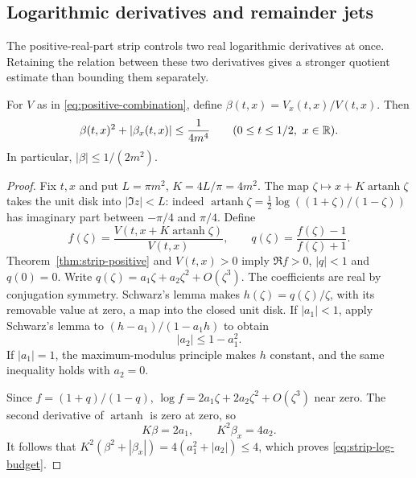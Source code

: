 \subsection{Logarithmic derivatives and remainder jets}

The positive-real-part strip controls two real logarithmic derivatives
at once. Retaining the relation between these two derivatives gives a
stronger quotient estimate than bounding them separately.

\begin{lemma}\label{lem:strip-Schwarz}
For $V$ as in \eqref{eq:positive-combination}, define
$\beta(t,x)=V_x(t,x)/V(t,x)$. Then
\begin{equation}\label{eq:strip-log-budget}
 \beta(t,x)^2+|\beta_x(t,x)|\le\frac1{4m^4}
 \qquad(0\le t\le1/2,\ x\in\mathbb R).
\end{equation}
In particular, $|\beta|\le1/(2m^2)$.
\end{lemma}
\begin{proof}
Fix $t,x$ and put $L=\pi m^2$, $K=4L/\pi=4m^2$. The map
$\zeta\mapsto x+K\operatorname{artanh}\zeta$ takes the unit disk
into $|\Im z|<L$: indeed
$\operatorname{artanh}\zeta=\frac12\log((1+\zeta)/(1-\zeta))$
has imaginary part between $-\pi/4$ and $\pi/4$. Define
\[
 f(\zeta)=\frac{V(t,x+K\operatorname{artanh}\zeta)}{V(t,x)},\qquad
 q(\zeta)=\frac{f(\zeta)-1}{f(\zeta)+1}.
\]
Theorem~\ref{thm:strip-positive} and $V(t,x)>0$ imply
$\Re f>0$, $|q|<1$ and $q(0)=0$. Write
$q(\zeta)=a_1\zeta+a_2\zeta^2+O(\zeta^3)$. The coefficients are
real by conjugation symmetry. Schwarz's lemma makes
$h(\zeta)=q(\zeta)/\zeta$, with its removable value at zero, a map
into the closed unit disk. If $|a_1|<1$, apply Schwarz's lemma to
$(h-a_1)/(1-a_1h)$ to obtain
\[
 |a_2|\le1-a_1^2.
\]
If $|a_1|=1$, the maximum-modulus principle makes $h$ constant, and
the same inequality holds with $a_2=0$.

Since $f=(1+q)/(1-q)$,
$\log f=2a_1\zeta+2a_2\zeta^2+O(\zeta^3)$ near zero.
The second derivative of $\operatorname{artanh}$ is zero at zero, so
\[
 K\beta=2a_1,\qquad K^2\beta_x=4a_2.
\]
It follows that
$K^2(\beta^2+|\beta_x|)=4(a_1^2+|a_2|)\le4$, which proves
\eqref{eq:strip-log-budget}.
\end{proof}

